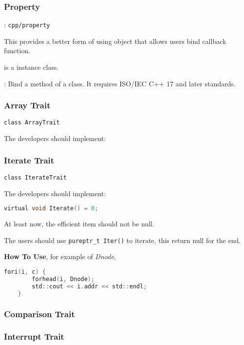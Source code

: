 
\subsubsection{Property}
: \verb`cpp/property`

This provides a better form of using object that allows users bind callback function.

 is a instance class.

: Bind a method of a class. It requires ISO/IEC C++ 17 and later standards.



\subsubsection{Array Trait}

\verb|class ArrayTrait|

The developers should implement:

\lstset{style=GlobalCxx}

\subsubsection{Iterate Trait}

\verb|class IterateTrait|

The developers should implement:

\lstset{style=GlobalC}
\begin{lstlisting}[language=C]
	virtual void Iterate() = 0;
\end{lstlisting}

At least now, the efficient item should not be null.

The users should use \verb|pureptr_t Iter()| to iterate, this return null for the end.

\textbf{How To Use}, for example of \textit{Dnode},

\lstset{style=GlobalC}
\begin{lstlisting}[language=C]
	fori(i, c) {
		forhead(i, Dnode);
		std::cout << i.addr << std::endl;
	}
\end{lstlisting}

\subsubsection{Comparison Trait}

\subsubsection{Interrupt Trait}



